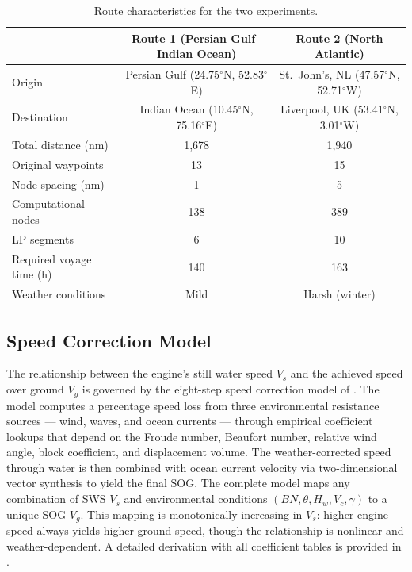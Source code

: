 \documentclass[review,authoryear]{elsarticle}  %
\newcommand{\degree}{\ensuremath{^\circ}}
\begin{document}
\begin{table}[htbp]
\centering
\caption{Route characteristics for the two experiments.}
\label{tab:routes}
\begin{tabular}{lcc}
\toprule
 & Route 1 (Persian Gulf--Indian Ocean) & Route 2 (North Atlantic) \\
\midrule
Origin & Persian Gulf (24.75\degree{}N, 52.83\degree{}E) & St.\ John's, NL (47.57\degree{}N, 52.71\degree{}W) \\
Destination & Indian Ocean (10.45\degree{}N, 75.16\degree{}E) & Liverpool, UK (53.41\degree{}N, 3.01\degree{}W) \\
Total distance (nm) & 1,678 & 1,940 \\
Original waypoints & 13 & 15 \\
Node spacing (nm) & 1 & 5 \\
Computational nodes & 138 & 389 \\
LP segments & 6 & 10 \\
Required voyage time (h) & 140 & 163 \\
Weather conditions & Mild & Harsh (winter) \\
\bottomrule
\end{tabular}
\end{table}


\subsection{Speed Correction Model}
\label{sec:sog}
\label{sec:speed-model}

The relationship between the engine's still water speed $V_s$ and the achieved speed over ground $V_g$ is governed by the eight-step speed correction model of \citet{Yang2020}. The model computes a percentage speed loss from three environmental resistance sources --- wind, waves, and ocean currents --- through empirical coefficient lookups that depend on the Froude number, Beaufort number, relative wind angle, block coefficient, and displacement volume. The weather-corrected speed through water is then combined with ocean current velocity via two-dimensional vector synthesis to yield the final SOG. The complete model maps any combination of SWS $V_s$ and environmental conditions $(BN, \theta, H_w, V_c, \gamma)$ to a unique SOG $V_g$. This mapping is monotonically increasing in $V_s$: higher engine speed always yields higher ground speed, though the relationship is nonlinear and weather-dependent. A detailed derivation with all coefficient tables is provided in \citet{Yang2020}.
\end{document}
